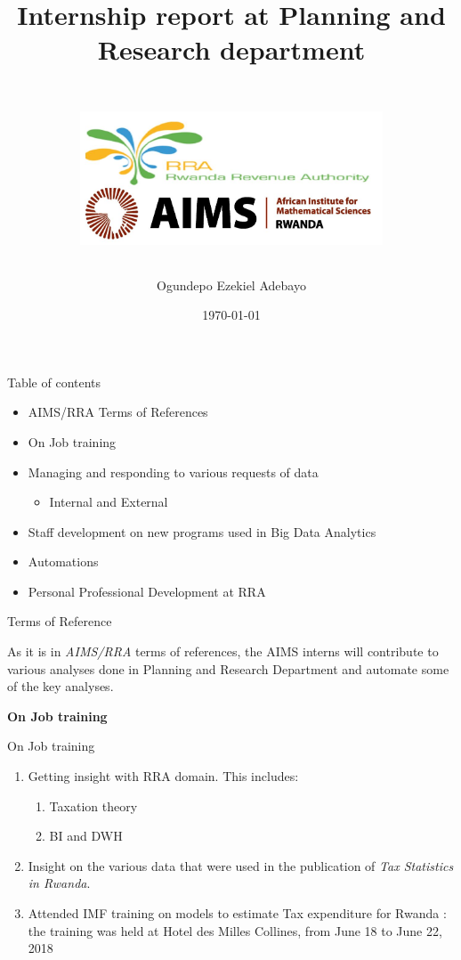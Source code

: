 \documentclass[ignorenonframetext,]{beamer}
\title{Internship report at Planning and Research department}
\author[The author]{\includegraphics[height=5.6cm,width=9cm]{Images/Logo1.JPG}\\Ogundepo Ezekiel Adebayo}
\date{\today}
\providecommand{\tightlist}{%
  \setlength{\itemsep}{0pt}\setlength{\parskip}{0pt}}
\begin{document}
\frame{\titlepage}

\begin{frame}{Table of contents}

\begin{itemize}
\tightlist
\item
  AIMS/RRA Terms of References
\item
  On Job training
\item
  Managing and responding to various requests of data

  \begin{itemize}
  \tightlist
  \item
    Internal and External
  \end{itemize}
\item
  Staff development on new programs used in Big Data Analytics
\item
  Automations
\item
  Personal Professional Development at RRA
\end{itemize}

\end{frame}

\begin{frame}{Terms of Reference}

As it is in \textit{AIMS/RRA} terms of references, the AIMS interns will
contribute to various analyses done in Planning and Research Department
and automate some of the key analyses.

\end{frame}

\begin{frame}{}

\begin{center}
\textbf{On Job training}
\end{center}

\end{frame}

\begin{frame}{On Job training}

\begin{enumerate}
\def\labelenumi{\arabic{enumi}.}
\tightlist
\item
  Getting insight with RRA domain. This includes:

  \begin{enumerate}
  \def\labelenumii{\arabic{enumii}.}
  \tightlist
  \item
    Taxation theory
  \item
    BI and DWH
  \end{enumerate}
\item
  Insight on the various data that were used in the publication of
  \textit{Tax Statistics in Rwanda}.
\item
  Attended IMF training on models to estimate Tax expenditure for Rwanda
  : the training was held at Hotel des Milles Collines, from June 18 to
  June 22, 2018
\end{enumerate}

\end{frame}
\end{document}
